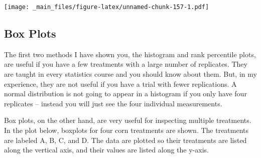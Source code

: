 \documentclass[
]{book}
\begin{document}
\texttt{[image: \_main\_files/figure-latex/unnamed-chunk-157-1.pdf]}

\hypertarget{box-plots}{%
\subsection{Box Plots}\label{box-plots}}

The first two methods I have shown you, the histogram and rank percentile plots, are useful if you have a few treatments with a large number of replicates. They are taught in every statistics course and you should know about them. But, in my experience, they are not useful if you have a trial with fewer replications. A normal distribution is not going to appear in a histogram if you only have four replicates -- instead you will just see the four individual measurements.

Box plots, on the other hand, are very useful for inspecting multiple treatments. In the plot below, boxplots for four corn treatments are shown. The treatments are labeled A, B, C, and D. The data are plotted so their treatments are listed along the vertical axis, and their values are listed along the y-axis.
\end{document}
